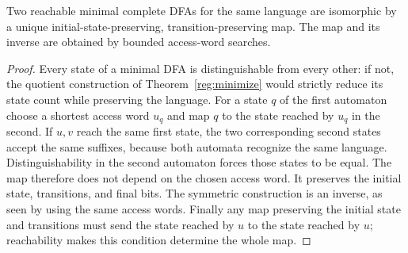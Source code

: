 \begin{corollary}\label{reg:unique}
Two reachable minimal complete DFAs for the same language are isomorphic
by a unique initial-state-preserving, transition-preserving map.
The map and its inverse are obtained by bounded access-word searches.
\end{corollary}
\begin{proof}
Every state of a minimal DFA is distinguishable from every other: if
not, the quotient construction of Theorem~\ref{reg:minimize} would
strictly reduce its state count while preserving the language.
For a state $q$ of the first automaton choose a shortest access word $u_q$
and map $q$ to the state reached by $u_q$ in the second.  If $u,v$ reach
the same first state, the two corresponding second states accept the
same suffixes, because both automata recognize the same language.
Distinguishability in the second automaton forces those states to be
equal.  The map therefore does not depend on the chosen access word.
It preserves the initial state, transitions, and final bits.  The symmetric
construction is an inverse, as seen by using the same access words.
Finally any map preserving the initial state and transitions must send
the state reached by $u$ to the state reached by $u$; reachability makes
this condition determine the whole map.
\end{proof}

